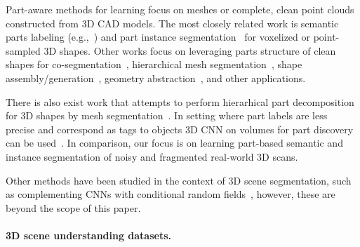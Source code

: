 Part-aware methods for learning  focus on meshes or complete, clean point clouds constructed from 3D CAD models. The most closely related work  is semantic parts labeling (e.g.,~\cite{yi2016scalable,wang2017cnn,qi2017pointnet,mo2019partnet,yi2019gspn,zhang2019point}) and part instance segmentation~\cite{zhang2019point} for voxelized or point-sampled 3D shapes. Other works focus on leveraging parts structure of clean shapes for co-segmentation~\cite{chen2019bae,zhu2019cosegnet}, hierarchical mesh segmentation~\cite{yi2017learning}, shape assembly/generation~\cite{mo2019structurenet,wu2019sagnet,wu2019pq,mo2020pt2pc}, geometry abstraction~\cite{russell2009associative,li2017grass,sun2019learning}, and other applications.

There is also exist work that attempts to perform hierarhical part decomposition for 3D shapes by mesh segmentation~\cite{yi2017learning}. In setting where part labels are less precise and correspond as tags to objects 3D CNN on volumes for part discovery can be used~\cite{muralikrishnan2018tags2parts}.
In comparison, our focus is on learning part-based semantic and instance segmentation of noisy and fragmented real-world 3D scans. 

Other methods have been studied in the context of 3D scene segmentation, such as complementing CNNs with conditional random fields~\cite{pham2019jsis3d,pham2019real,wang2017cnn}, however, these are beyond the scope of this paper.


\paragraph{3D scene understanding datasets.}
\label{related:datasets}


